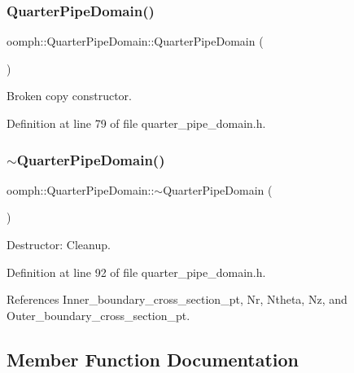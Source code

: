 \subsubsection{\texorpdfstring{Quarter\+Pipe\+Domain()}{QuarterPipeDomain()}\hspace{0.1cm}{\footnotesize\ttfamily [2/2]}}
{\footnotesize\ttfamily oomph\+::\+Quarter\+Pipe\+Domain\+::\+Quarter\+Pipe\+Domain (\begin{DoxyParamCaption}\item[{const \hyperlink{classoomph_1_1QuarterPipeDomain}{Quarter\+Pipe\+Domain} \&}]{ }\end{DoxyParamCaption})\hspace{0.3cm}{\ttfamily [inline]}}



Broken copy constructor. 



Definition at line 79 of file quarter\+\_\+pipe\+\_\+domain.\+h.

\mbox{\label{classoomph_1_1QuarterPipeDomain_a872560e53bf73ef0bd1b69f2a40612c8}} 
\subsubsection{\texorpdfstring{$\sim$\+Quarter\+Pipe\+Domain()}{~QuarterPipeDomain()}}
{\footnotesize\ttfamily oomph\+::\+Quarter\+Pipe\+Domain\+::$\sim$\+Quarter\+Pipe\+Domain (\begin{DoxyParamCaption}{ }\end{DoxyParamCaption})\hspace{0.3cm}{\ttfamily [inline]}}



Destructor\+: Cleanup. 



Definition at line 92 of file quarter\+\_\+pipe\+\_\+domain.\+h.



References Inner\+\_\+boundary\+\_\+cross\+\_\+section\+\_\+pt, Nr, Ntheta, Nz, and Outer\+\_\+boundary\+\_\+cross\+\_\+section\+\_\+pt.



\subsection{Member Function Documentation}
\mbox{\label{classoomph_1_1QuarterPipeDomain_a035e27884c0fa1bc31d1d9bed28c37bd}} 
